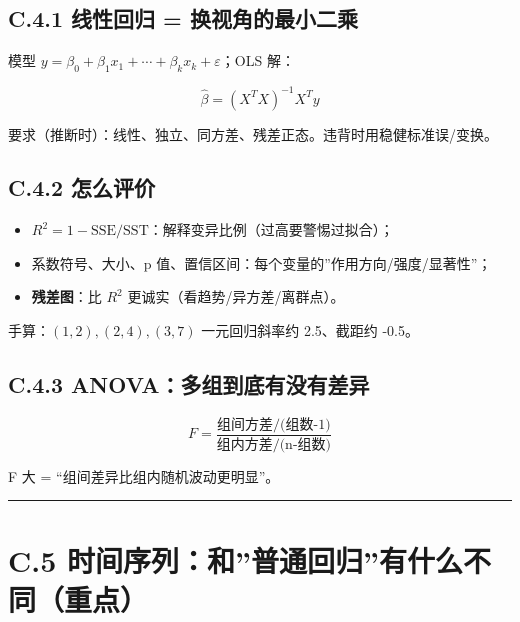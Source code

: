 \subsection{C.4.1 线性回归 =
换视角的最小二乘}\label{c.4.1-ux7ebfux6027ux56deux5f52-ux6362ux89c6ux89d2ux7684ux6700ux5c0fux4e8cux4e58}

模型 \(y=\beta_0+\beta_1x_1+\cdots+\beta_kx_k+\varepsilon\)；OLS 解：

\[\hat{\beta}= (X^TX)^{-1}X^Ty\]

要求（推断时）：线性、独立、同方差、残差正态。违背时用稳健标准误/变换。

\subsection{C.4.2 怎么评价}\label{c.4.2-ux600eux4e48ux8bc4ux4ef7}

\begin{itemize}
\tightlist
\item
  \(R^2=1-\mathrm{SSE}/\mathrm{SST}\)：解释变异比例（过高要警惕过拟合）；
\item
  系数符号、大小、p 值、置信区间：每个变量的''作用方向/强度/显著性''；
\item
  \textbf{残差图}：比 \(R^2\) 更诚实（看趋势/异方差/离群点）。
\end{itemize}

手算：\((1,2),(2,4),(3,7)\) 一元回归斜率约 2.5、截距约 -0.5。

\subsection{C.4.3
ANOVA：多组到底有没有差异}\label{c.4.3-anovaux591aux7ec4ux5230ux5e95ux6709ux6ca1ux6709ux5deeux5f02}

\[F=\frac{\text{组间方差}/\text{(组数-1)}}{\text{组内方差}/\text{(n-组数)}}\]

F 大 = ``组间差异比组内随机波动更明显''。

\begin{center}\rule{0.5\linewidth}{0.5pt}\end{center}

\section{C.5
时间序列：和''普通回归''有什么不同（重点）}\label{c.5-ux65f6ux95f4ux5e8fux5217ux548cux666eux901aux56deux5f52ux6709ux4ec0ux4e48ux4e0dux540cux91cdux70b9}

